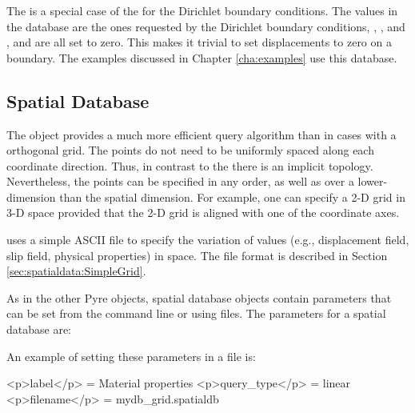 \subsubsection{}

The  is a special case of the  for the Dirichlet
boundary conditions. The values in the database are the ones requested
by the Dirichlet boundary conditions, , ,
and , and are all set to zero. This makes it
trivial to set displacements to zero on a boundary. The examples discussed
in Chapter \vref{cha:examples} use this database.


\subsection{ Spatial Database}

The  object provides a much more efficient query
algorithm than  in cases with a orthogonal grid. The
points do not need to be uniformly spaced along each coordinate
direction. Thus, in contrast to the  there is an
implicit topology. Nevertheless, the points can be specified in any
order, as well as over a lower-dimension than the spatial dimension.
For example, one can specify a 2-D grid in 3-D space provided that the
2-D grid is aligned with one of the coordinate axes.

 uses a simple ASCII file to specify the variation of
values (e.g., displacement field, slip field, physical properties) in
space. The file format is described in Section
\vref{sec:spatialdata:SimpleGrid}.

As in the other Pyre objects, spatial database objects contain parameters
that can be set from the command line or using 
files. The parameters for a spatial database are:
\begin{inventory}
\end{inventory}
An example of setting these parameters in a  file is:
\begin{cfg}
<p>label</p> = Material properties
<p>query_type</p> = linear
<p>filename</p> = mydb_grid.spatialdb
\end{cfg}

